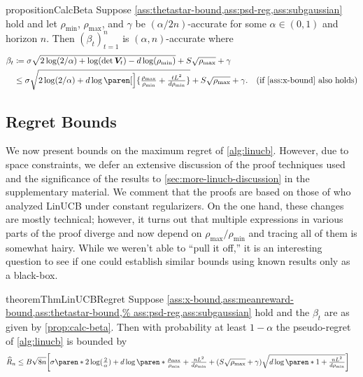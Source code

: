 \documentclass{article}
\renewcommand{\vec}[1]{\bm{#1}}
\newcommand{\defeq}{\coloneq}
\renewcommand{\det}{\operatorname{det}}
\DeclarePairedDelimiter{\paren}()
\DeclarePairedDelimiter{\brck}{[}{]}
\begin{document}
\begin{restatable}{proposition}{CalcBeta}%
  \label{prop:calc-beta}
  Suppose
  \cref{ass:thetastar-bound,ass:psd-reg,ass:subgaussian}
  hold and let $\rho_{\min}$, $\rho_{\max}$, and $\gamma$ be
  $(\alpha/2n)$-accurate for some $\alpha\in(0,1)$ and horizon $n$.
  Then $(\beta_t)_{t=1}^n$ is $(\alpha,n)$-accurate where
  \begin{align*}
    \beta_t
    &\defeq \sigma\sqrt{2\log(2/\alpha) + \log(\det \vec V_t) - d\log(\rho_{\min})}
      + S\sqrt{\rho_{\max}} + \gamma \\
    &\le \sigma\sqrt{2\log({2}/{\alpha}) + d\log\paren[\Big]{\tfrac{\rho_{\max}}{\rho_{\min}}
      + \tfrac{tL^2}{d\rho_{\min}}}}
      + S\sqrt{\rho_{\max}} + \gamma.
    &\text{(if \cref{ass:x-bound} also holds)}
  \end{align*}
\end{restatable}

\vspace{-5pt}
\subsection{Regret Bounds}
\label{sec:regret-bounds}

We now present bounds on the maximum regret of \cref{alg:linucb}.
However, due to space constraints, we defer an extensive discussion of
the proof techniques used and the significance of the results to
\cref{sec:more-linucb-discussion} in the supplementary material. We comment that the proofs are based on those of
\citet{AbbasiYadkoriImprovedAlgorithmsLinear2011} who analyzed LinUCB under constant regularizers. On the one hand, these changes are mostly technical; however, it turns out that multiple expressions in various parts of the proof diverge and now depend on $\rho_{\max} / \rho_{\min}$ and tracing all of them is somewhat hairy. While we weren't able to ``pull it off,'' it is an interesting question to see if one could establish similar bounds using known results only as a black-box.

\begin{restatable}{theorem}{ThmLinUCBRegret}%
  \label{thm:linucb-regret}%
  Suppose \cref{ass:x-bound,ass:meanreward-bound,ass:thetastar-bound,%
    ass:psd-reg,ass:subgaussian} hold and the
  $\beta_t$ are as given by \cref{prop:calc-beta}.  Then with
  probability at least $1-\alpha$ the pseudo-regret of
  \cref{alg:linucb} is bounded by
    \begin{align}
    \label{eq:regret_general_formula}
    \widehat R_n
    &\le B \sqrt{8n}\brck[\bigg]{\sigma\paren*{2\log(\tfrac{2}{\alpha})
      + d\log\paren*{\tfrac{\rho_{\max}}{\rho_{\min}} + \tfrac{nL^2}{d\rho_{\min}}}}
      + (S\sqrt{\rho_{\max}} + \gamma)\sqrt{d\log\paren*{1 + \tfrac{nL^2}{d\rho_{\min}}}}}
  \end{align}
\end{restatable}
\end{document}
